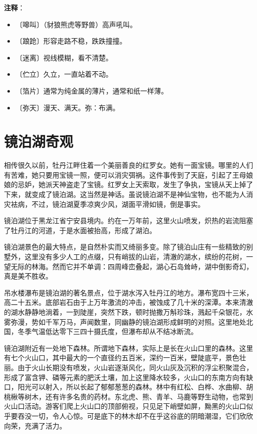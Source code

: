 \documentclass[12pt,UTF-8,openany]{ctexbook}
\begin{document}
\newpage

\textbf{注释}：

\vspace{-1em}

\begin{itemize}
    \setlength\itemsep{-0.2em}
    \item 〔嗥叫〕（豺狼熊虎等野兽）高声吼叫。
    \item 〔踉跄〕形容走路不稳，跌跌撞撞。
    \item 〔迷离〕视线模糊，看不清楚。
    \item 〔伫立〕久立，一直站着不动。
    \item 〔箔片〕通常为纯金属的薄片，通常和纸一样薄。
    \item 〔弥天〕漫天、满天。弥：布满。
\end{itemize}

\chapter{镜泊湖奇观}

\begin{Large}
    
    相传很久以前，牡丹江畔住着一个美丽善良的红罗女。她有一面宝镜。哪里的人们有苦难，她只要用宝镜一照，便可以消灾弭祸。这件事传到了天庭，引起了王母娘娘的忌妒，她派天神盗走了宝镜。红罗女上天索取，发生了争执，宝镜从天上掉了下来，就变成了镜泊湖。这当然是神话。虽说镜泊湖不是神仙宝物，也不能为人消灾袪病，不过，镜泊湖夏季凉爽少风，湖面平滑如镜，倒是事实。
    
    镜泊湖位于黑龙江省宁安县境内。约在一万年前，这里火山喷发，炽热的岩流阻塞了牡丹江的河道，于是水面被抬高，形成了湖泊。
    
    镜泊湖景色的最大特点，是自然朴实而又绮丽多变。除了镜泊山庄有一些精致的别墅外，这里没有多少人工的点缀，只有峭拔的山岩，清澈的湖水，缤纷的花树，一望无际的林海。然而它并不单调：四周峰峦叠起，湖心石岛耸峙，湖中倒影奇幻，真是美不胜收。
    
    吊水楼瀑布是镜泊湖的著名景点，位于湖水泻入牡丹江的地方。瀑布宽四十三米，高二十五米。底部岩石由于上万年激流的冲击，被蚀成了几十米的深潭。本来清澈的湖水静静地淌着，一到陡崖，突然下跌，顿时抛撒万斛珍珠，溅起千朵银花，水雾弥漫，势如千军万马，声闻数里，同幽静的镜泊湖形成鲜明的对照。这里地处北国，冬季气温低达零下三四十摄氏度，但瀑布却从不结冰断流。
    
    镜泊湖附近有一处地下森林。所谓地下森林，实际上是长在火山口里的森林。这里有七个火山口，其中最大的一个直径约五百米，深约一百米，壁陡底平，景色壮丽。由于火山长期没有喷发，火山岩逐渐风化，同火山灰及沉积的浮尘积聚混合，形成了富含钾、磷等元素的肥沃土壤，加上这里降水较多，火山口的东南方向有缺口，阳光可以射入，所以长起了郁郁葱葱的森林。林中有红松、白桦、水曲柳、胡桃楸等树木，还有许多名贵的药材。东北虎、熊、青羊、马鹿等野生动物，也常到火山口活动。游客们爬上火山口的顶部俯视，只见足下峭壁如屏，黝黑的火山口似乎要吞没一切，令人心惊。可是底下的林木却不在乎这谷底的阴暗潮湿，它们欣欣向荣，充满了活力。
    
\end{Large}
\end{document}
